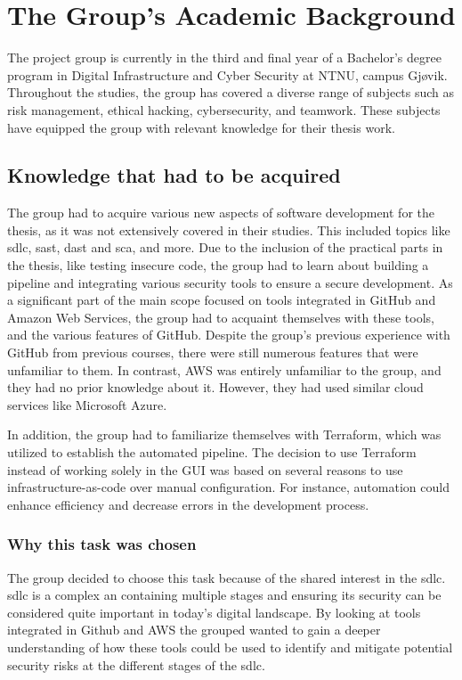  

\section{The Group’s Academic Background}
The project group is currently in the third and final year of a Bachelor's degree program in Digital Infrastructure and Cyber Security at NTNU, campus Gjøvik. Throughout the studies, the group has covered a diverse range of subjects such as risk management, ethical hacking, cybersecurity, and teamwork. These subjects have equipped the group with relevant knowledge for their thesis work.

\subsection{Knowledge that had to be acquired}
\label{section: Knowledge that had to be acquired}
The group had to acquire various new aspects of software development for the thesis, as it was not extensively covered in their studies. This included topics like \acrshort{sdlc}, \acrlong{sast}, \acrlong{dast} and \acrlong{sca}, and more. Due to the inclusion of the practical parts in the thesis, like testing insecure code, the group had to learn about building a pipeline and integrating various security tools to ensure a secure development. As a significant part of the main scope focused on tools integrated in GitHub and Amazon Web Services, the group had to acquaint themselves with these tools, and the various features of GitHub. Despite the group's previous experience with GitHub from previous courses, there were still numerous features that were unfamiliar to them. In contrast, AWS was entirely unfamiliar to the group, and they had no prior knowledge about it. However, they had used similar cloud services like Microsoft Azure.

In addition, the group had to familiarize themselves with Terraform, which was utilized to establish the automated pipeline. The decision to use Terraform instead of working solely in the GUI was based on several reasons to use infrastructure-as-code over manual configuration. For instance, automation could enhance efficiency and decrease errors in the development process.

\subsubsection{Why this task was chosen}
The group decided to choose this task because of the shared interest in the \acrlong{sdlc}. \acrshort{sdlc} is a complex an containing multiple stages and ensuring its security can be considered quite important in today's digital landscape. By looking at tools integrated in Github and AWS the grouped wanted to gain a deeper understanding of how these tools could be used to identify and mitigate potential security risks at the different stages of the \acrshort{sdlc}.
